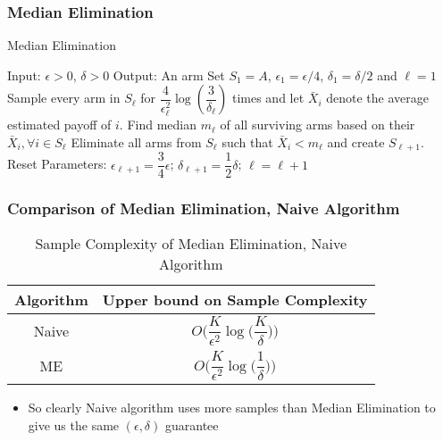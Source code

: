 \begin{frame}
\frametitle{Median Elimination}
\begin{algorithm}[H]
\caption{Median Elimination}
\begin{algorithmic}[1]
\State Input: $\epsilon > 0$, $\delta > 0$
\State Output: An arm  
\State Set $S_1 =A$, $\epsilon_1 = \epsilon/4$, $\delta_1=\delta/2$ and $\ell=1$
\State Sample every arm in $S_\ell$ for $\dfrac{4}{\epsilon_{\ell}^{2}}\log(\dfrac{3}{\delta_\ell})$ times and let $\bar{X}_i$ denote the average estimated payoff of $i$.
\State Find median $m_{\ell}$ of all surviving arms based on their $\bar{X}_{i},\forall i\in S_\ell$
\State Eliminate all arms from $S_{\ell}$ such that $\bar{X}_{i}< m_{\ell}$ and create $S_{\ell+1}$.
\State Reset Parameters: $\epsilon_{\ell+1}=\dfrac{3}{4}\epsilon$; $\delta_{\ell+1}=\dfrac{1}{2}\delta$; $\ell=\ell+1$
\EndFor
\end{algorithmic}
\end{algorithm}
\cite{even2006action}
\end{frame}

\begin{frame}
\frametitle{Comparison of Median Elimination, Naive Algorithm}

\begin{table}
\caption{Sample Complexity of Median Elimination, Naive Algorithm}
\begin{center}
\begin{tabular}{|c|c|}
\toprule
Algorithm  & Upper bound on Sample Complexity \\
\midrule
Naive        &$O\bigg(\dfrac{K}{\epsilon^2}\log \big( \dfrac{K}{\delta} \big) \bigg)$ \\\midrule
ME      &$O\bigg(\dfrac{K}{\epsilon^2}\log \big( \dfrac{1}{\delta} \big)  \bigg)$\\\bottomrule
\end{tabular}
\end{center}
\end{table}

\begin{itemize}
\item<1-> So clearly Naive algorithm uses more samples than Median Elimination to give us the same $(\epsilon,\delta)$ guarantee
\end{itemize}

\end{frame}

